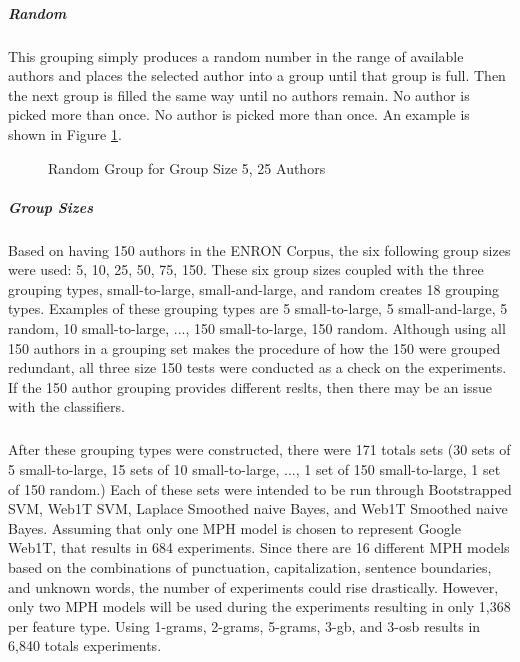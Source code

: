 		\subparagraph{Random} This grouping simply produces a random number in the range of available authors and places the selected author into a group until that group is full.  Then the next group is filled the same way until no authors remain.  No author is picked more than once. No author is picked more than once. An example is shown in Figure \ref{fig:randomGrouping}.
		\begin{figure}[ht!]
			\begin{center}
				\caption{Random Group for Group Size 5, 25 Authors}
				\label{fig:randomGrouping}
			\end{center}
		\end{figure}
		\subparagraph{Group Sizes} Based on having 150 authors in the ENRON Corpus, the six following group sizes were used: 5, 10, 25, 50, 75, 150.  These six group sizes coupled with the three grouping types, small-to-large, small-and-large, and random creates 18 grouping types.  Examples of these grouping types are 5 small-to-large, 5 small-and-large, 5 random, 10 small-to-large, ..., 150 small-to-large, 150 random.  Although using all 150 authors in a grouping set makes the procedure of how the 150 were grouped redundant, all three size 150 tests were conducted as a check on the experiments. If the 150 author grouping provides different reslts, then there may be an issue with the classifiers.
		\subparagraph{}After these grouping types were constructed, there were 171 totals sets (30 sets of 5 small-to-large, 15 sets of 10 small-to-large, ..., 1 set of 150 small-to-large, 1 set of 150 random.)  Each of these sets were intended to be run through Bootstrapped SVM, Web1T SVM, Laplace Smoothed naive Bayes, and Web1T Smoothed naive Bayes.  Assuming that only one MPH model is chosen to represent Google Web1T, that results in 684 experiments.  Since there are 16 different MPH models based on the combinations of punctuation, capitalization, sentence boundaries, and unknown words, the number of experiments could rise drastically.  However, only two MPH models will be used during the experiments resulting in only 1,368 per feature type.  Using 1-grams, 2-grams, 5-grams, 3-gb, and 3-osb results in 6,840 totals experiments.
	
